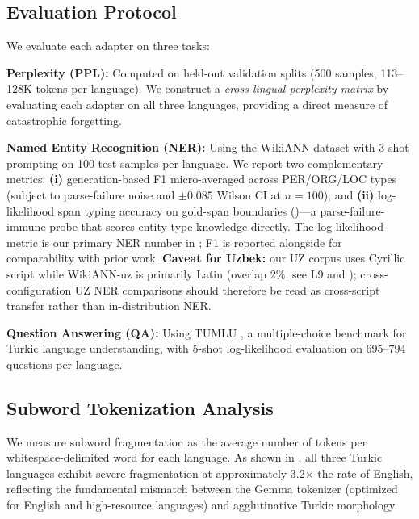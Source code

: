 \documentclass[11pt]{article}
\begin{document}
\subsection{Evaluation Protocol}

We evaluate each adapter on three tasks:

\textbf{Perplexity (PPL):} Computed on held-out validation splits (500 samples, 113--128K tokens per language). We construct a \emph{cross-lingual perplexity matrix} by evaluating each adapter on all three languages, providing a direct measure of catastrophic forgetting.

\textbf{Named Entity Recognition (NER):} Using the WikiANN dataset \cite{pan2017cross} with 3-shot prompting on 100 test samples per language. We report two complementary metrics: \textbf{(i)} generation-based F1 micro-averaged across PER/ORG/LOC types (subject to parse-failure noise and $\pm 0.085$ Wilson CI at $n{=}100$); and \textbf{(ii)} log-likelihood span typing accuracy on gold-span boundaries ()---a parse-failure-immune probe that scores entity-type knowledge directly. The log-likelihood metric is our primary NER number in ; F1 is reported alongside for comparability with prior work. \textbf{Caveat for Uzbek:} our UZ corpus uses Cyrillic script while WikiANN-uz is primarily Latin (overlap $2\%$, see L9 and ); cross-configuration UZ NER comparisons should therefore be read as cross-script transfer rather than in-distribution NER.

\textbf{Question Answering (QA):} Using TUMLU \cite{isbarov2024tumlu}, a multiple-choice benchmark for Turkic language understanding, with 5-shot log-likelihood evaluation on 695--794 questions per language.

\subsection{Subword Tokenization Analysis}
\label{sec:tokenization}

We measure subword fragmentation as the average number of tokens per whitespace-delimited word for each language. As shown in , all three Turkic languages exhibit severe fragmentation at approximately 3.2$\times$ the rate of English, reflecting the fundamental mismatch between the Gemma tokenizer (optimized for English and high-resource languages) and agglutinative Turkic morphology.
\end{document}
